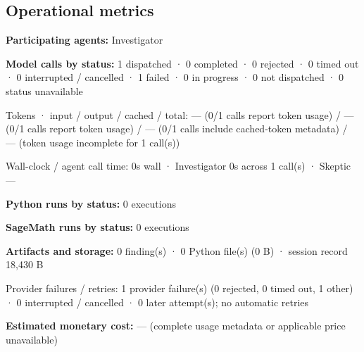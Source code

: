 \documentclass[11pt]{article}
\begin{document}
\subsection{Operational metrics}
\textbf{Participating agents:} Investigator\par
\textbf{Model calls by status:} 1 dispatched · 0 completed · 0 rejected · 0 timed out · 0 interrupted / cancelled · 1 failed · 0 in progress · 0 not dispatched · 0 status unavailable\par
Tokens · input / output / cached / total: — (0/1 calls report token usage) / — (0/1 calls report token usage) / — (0/1 calls include cached-token metadata) / — (token usage incomplete for 1 call(s))\par
Wall-clock / agent call time: 0s wall · Investigator 0s across 1 call(s) · Skeptic —\par
\textbf{Python runs by status:} 0 executions\par
\textbf{SageMath runs by status:} 0 executions\par
\textbf{Artifacts and storage:} 0 finding(s) · 0 Python file(s) (0 B) · session record 18,430 B\par
Provider failures / retries: 1 provider failure(s) (0 rejected, 0 timed out, 1 other) · 0 interrupted / cancelled · 0 later attempt(s); no automatic retries\par
\textbf{Estimated monetary cost:} — (complete usage metadata or applicable price unavailable)\par
\end{document}
